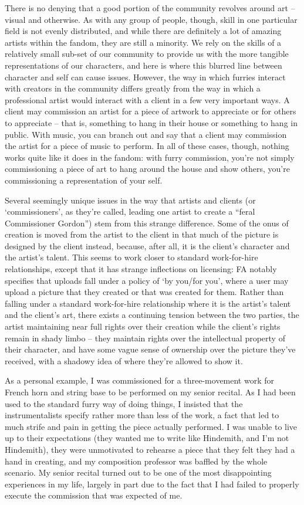 There is no denying that a good portion of the community revolves around art -- visual and otherwise.  As with any group of people, though, skill in one particular field is not evenly distributed, and while there are definitely a lot of amazing artists within the fandom, they are still a minority.  We rely on the skills of a relatively small sub-set of our community to provide us with the more tangible representations of our characters, and here is where this blurred line between character and self can cause issues.  However, the way in which furries interact with creators in the community differs greatly from the way in which a professional artist would interact with a client in a few very important ways.  A client may commission an artist for a piece of artwork to appreciate or for others to appreciate -- that is, something to hang in their house or something to hang in public.  With  music, you can branch out and say that a client may commission the artist for a piece of music to perform.  In all of these cases, though, nothing works quite like it does in the fandom: with furry commission, you're not simply commissioning a piece of art to hang around the house and show others, you're commissioning a representation of your self.

Several seemingly unique issues in the way that artists and clients (or `commissioners', as they're called, leading one artist to create a “feral Commissioner Gordon”) stem from this strange difference.  Some of the onus of creation is moved from the artist to the client in that much of the picture is designed by the client instead, because, after all, it is the client's character and the artist's talent.  This seems to work closer to standard work-for-hire relationships, except that it has strange inflections on licensing: FA notably specifies that uploads fall under a policy of `by you/for you', where a user may upload a picture that they created or that was created for them.  Rather than falling under a standard work-for-hire relationship where it is the artist's talent and the client's art, there exists a continuing tension between the two parties, the artist maintaining near full rights over their creation while the client's rights remain in shady limbo -- they maintain rights over the intellectual property of their character, and have some vague sense of ownership over the picture they've received, with a shadowy idea of where they're allowed to show it.

As a personal example, I was commissioned for a three-movement work for French horn and string base to be performed on my senior recital.  As I had been used to the standard furry way of doing things, I insisted that the instrumentalists specify rather more than less of the work, a fact that led to much strife and pain in getting the piece actually performed.  I was unable to live up to their expectations (they wanted me to write like Hindemith, and I'm not Hindemith), they were unmotivated to rehearse a piece that they felt they had a hand in creating, and my composition professor was baffled by the whole scenario.  My senior recital turned out to be one of the most disappointing experiences in my life, largely in part due to the fact that I had failed to properly execute the commission that was expected of me.

